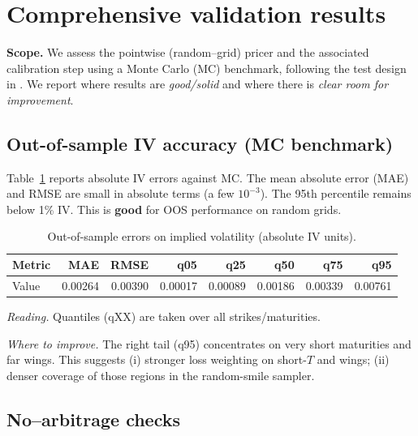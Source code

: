 	\section{Comprehensive validation results}
	\label{sec:comprehensive_validation}
	
	\noindent\textbf{Scope.} We assess the pointwise (random–grid) pricer and the associated calibration step using a Monte Carlo (MC) benchmark, following the test design in \citet{Baschetti2024DeepCalibrationRandomGrids}. We report where results are \emph{good/solid} and where there is \emph{clear room for improvement}.
	
	\subsection*{Out-of-sample IV accuracy (MC benchmark)}
	\label{subsec:oos_iv}
	
	Table~\ref{tab:oos_metrics} reports absolute IV errors against MC. The mean absolute error (MAE) and RMSE are small in absolute terms (a few $10^{-3}$). The 95th percentile remains below 1\% IV. This is \textbf{good} for OOS performance on random grids.
	
	\begin{table}[t]
		\centering
		\caption{Out-of-sample errors on implied volatility (absolute IV units).}
		\label{tab:oos_metrics}
		\begin{tabular}{lrrrrrrr}
			\toprule
			Metric & MAE & RMSE & q05 & q25 & q50 & q75 & q95 \\
			\midrule
			Value  & 0.00264 & 0.00390 & 0.00017 & 0.00089 & 0.00186 & 0.00339 & 0.00761 \\
			\bottomrule
		\end{tabular}
		
		\smallskip
		\footnotesize
		\textit{Reading.} Quantiles (qXX) are taken over all strikes/maturities.
	\end{table}
	
	\noindent\textit{Where to improve.} The right tail (q95) concentrates on very short maturities and far wings. This suggests (i) stronger loss weighting on short-$T$ and wings; (ii) denser coverage of those regions in the random-smile sampler.
	
	\subsection*{No–arbitrage checks}
	
